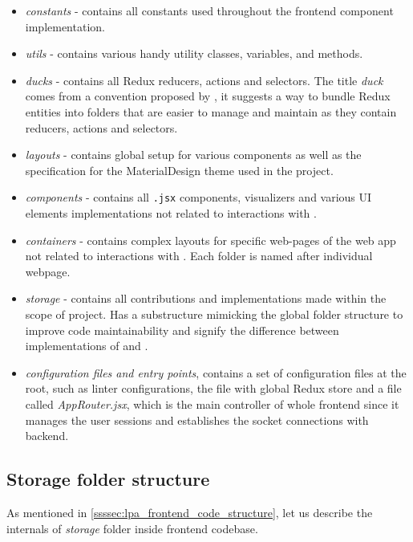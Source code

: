 \begin{itemize}
    \item \textit{constants} - contains all constants used throughout the frontend component implementation.
    \item \textit{utils} - contains various handy utility classes, variables, and methods.
    \item \textit{ducks} - contains all Redux reducers, actions and selectors. The title \textit{duck} comes from a convention proposed by \cite{erikras_2019}, it suggests a way to bundle Redux entities into folders that are easier to manage and maintain as they contain reducers, actions and selectors.
    \item \textit{layouts} - contains global setup for various components as well as the specification for the MaterialDesign theme used in the project.
    \item \textit{components} - contains all \texttt{.jsx} components, visualizers and various UI elements implementations not related to interactions with \solid{}.
    \item \textit{containers} - contains complex layouts for specific web-pages of the web app not related to interactions with \solid{}. Each folder is named after individual webpage. 
    \item \textit{storage} - contains all contributions and implementations made within the scope of \lpas{} project. Has a substructure mimicking the global folder structure to improve code maintainability and signify the difference between implementations of \lpa{} and \lpas{}.
    \item \textit{configuration files and entry points}, contains a set of configuration files at the root, such as linter configurations, the file with global Redux store and a file called \textit{AppRouter.jsx}, which is the main controller of whole frontend since it manages the user sessions and establishes the socket connections with \lpa{} backend.
\end{itemize}

\subsection{Storage folder structure}
\label{sssec:storage_folder_structure}

As mentioned in \autoref{ssssec:lpa_frontend_code_structure}, let us describe the internals of \textit{storage} folder inside \lpa{} frontend codebase. 

